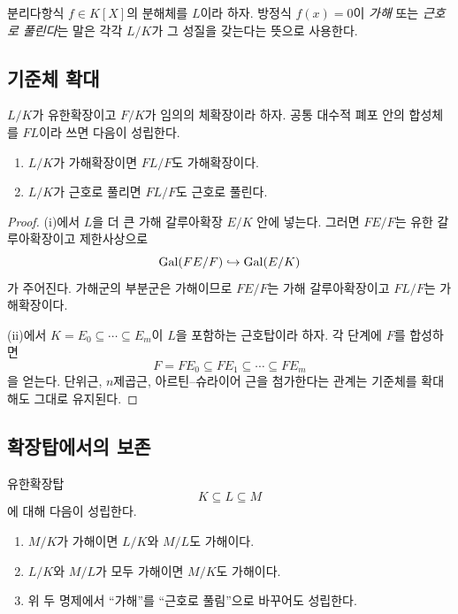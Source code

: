 분리다항식 $f\in K[X]$의 분해체를 $L$이라 하자. 방정식 $f(x)=0$이 \emph{가해} 또는 \emph{근호로 풀린다}는 말은 각각 $L/K$가 그 성질을 갖는다는 뜻으로 사용한다.

\subsection{기준체 확대}

\begin{lemma}[기준체 확대]
\label{lem:solvability-base-change}
$L/K$가 유한확장이고 $F/K$가 임의의 체확장이라 하자. 공통 대수적 폐포 안의 합성체를 $FL$이라 쓰면 다음이 성립한다.
\begin{enumerate}[label=(\roman*)]
  \item $L/K$가 가해확장이면 $FL/F$도 가해확장이다.
  \item $L/K$가 근호로 풀리면 $FL/F$도 근호로 풀린다.
\end{enumerate}
\end{lemma}

\begin{proof}
(i)에서 $L$을 더 큰 가해 갈루아확장 $E/K$ 안에 넣는다. 그러면 $FE/F$는 유한 갈루아확장이고 제한사상으로
\[
  \operatorname{Gal}(FE/F)\hookrightarrow\operatorname{Gal}(E/K)
\]
가 주어진다. 가해군의 부분군은 가해이므로 $FE/F$는 가해 갈루아확장이고 $FL/F$는 가해확장이다.

(ii)에서 $K=E_0\subseteq\cdots\subseteq E_m$이 $L$을 포함하는 근호탑이라 하자. 각 단계에 $F$를 합성하면
\[
  F=FE_0\subseteq FE_1\subseteq\cdots\subseteq FE_m
\]
을 얻는다. 단위근, $n$제곱근, 아르틴--슈라이어 근을 첨가한다는 관계는 기준체를 확대해도 그대로 유지된다.
\end{proof}

\subsection{확장탑에서의 보존}

\begin{theorem}[탑 성질]
\label{thm:solvability-tower-property}
유한확장탑
\[
  K\subseteq L\subseteq M
\]
에 대해 다음이 성립한다.
\begin{enumerate}[label=(\roman*)]
  \item $M/K$가 가해이면 $L/K$와 $M/L$도 가해이다.
  \item $L/K$와 $M/L$가 모두 가해이면 $M/K$도 가해이다.
  \item 위 두 명제에서 ``가해''를 ``근호로 풀림''으로 바꾸어도 성립한다.
\end{enumerate}
\end{theorem}

